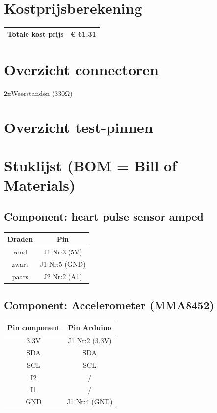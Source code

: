 \documentclass[a4paper]{report}
\begin{document}
\section{Kostprijsberekening}
\begin{tabular}{|c|c|}
    \hline
    Totale kost prijs & € 61.31\\
    \hline
\end{tabular}

\section{Overzicht connectoren}
2xWeerstanden (330Ω)

\section{Overzicht test-pinnen}
\section{Stuklijst (BOM = Bill of Materials)}
\subsection{Component: heart pulse sensor amped}
\begin{tabular}{|c|c|}
    \hline
    Draden & Pin\\
    \hline
    rood  & J1 Nr:3 (5V)\\
    zwart & J1 Nr:5 (GND)\\
    paars & J2 Nr:2 (A1)\\
    \hline
\end{tabular}

\subsection{Component: Accelerometer (MMA8452)}
\begin{tabular}{|c|c|}
    \hline
    Pin component & Pin Arduino\\
    \hline
    3.3V & J1 Nr:2 (3.3V)\\
    SDA  & SDA\\
    SCL  & SCL\\
    I2   & /\\
    I1   & /\\
    GND  & J1 Nr:4 (GND)\\
    \hline
\end{tabular}
\end{document}
